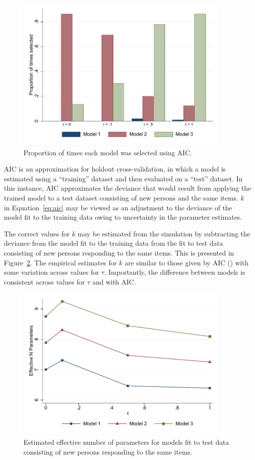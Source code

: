 \documentclass[12pt, letterpaper]{article}
\begin{document}
\begin{figure}[tbp]
	\centering
	\includegraphics[height=3in, trim = 1mm 1mm 1mm 1mm, clip=true]
		{chapter_2/figs/select_aic.pdf}
	\caption{Proportion of times each model was selected using AIC.}
	\label{fig:select-aic}
\end{figure}

AIC is an approximation for holdout cross-validation, in which a model is estimated using a ``training'' dataset and then evaluated on a ``test'' dataset. In this instance, AIC approximates the deviance that would result from applying the trained model to a test dataset consisting of new persons and the same items.  $k$ in Equation~\ref{eq:aic} may be viewed as an adjustment to the deviance of the model fit to the training data owing to uncertainty in the parameter estimates. 

The correct values for $k$ may be estimated from the simulation by subtracting the deviance from the model fit to the training data from the fit to test data consisting of new persons responding to the same items. This is presented in Figure~\ref{fig:k-new-persons}. The empirical estimates for $k$ are similar to those given by AIC (\aic[and]) with some variation across values for $\tau$. Importantly, the difference between models is consistent across values for $\tau$ and with AIC.

\begin{figure}[tbp]
	\centering
	\includegraphics[height=3in, trim = 1mm 1mm 1mm 1mm, clip=true]
	{chapter_2/figs/p_newpersons.pdf}
	\caption{Estimated effective number of parameters for models fit to test data consisting of new persons responding to the same items.}
	\label{fig:k-new-persons}
\end{figure}
\end{document}
